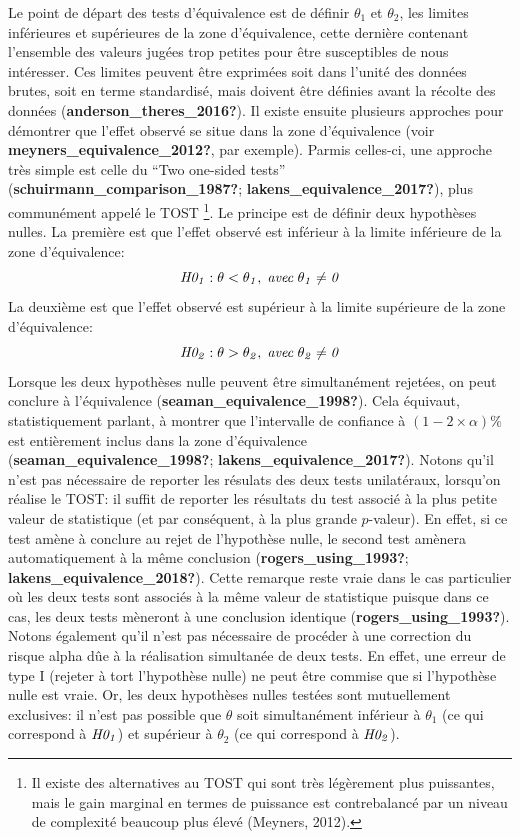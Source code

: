 \documentclass[
  english,
  man]{apa6}
\begin{document}
Le point de départ des tests d'équivalence est de définir \(\theta_1\) et \(\theta_2\), les limites inférieures et supérieures de la zone d'équivalence, cette dernière contenant l'ensemble des valeurs jugées trop petites pour être susceptibles de nous intéresser. Ces limites peuvent être exprimées soit dans l'unité des données brutes, soit en terme standardisé, mais doivent être définies avant la récolte des données (\textbf{anderson\_theres\_2016?}). Il existe ensuite plusieurs approches pour démontrer que l'effet observé se situe dans la zone d'équivalence (voir \textbf{meyners\_equivalence\_2012?}, par exemple). Parmis celles-ci, une approche très simple est celle du ``Two one-sided tests'' (\textbf{schuirmann\_comparison\_1987?}; \textbf{lakens\_equivalence\_2017?}), plus communément appelé le TOST \footnote{Il existe des alternatives au TOST qui sont très légèrement plus puissantes, mais le gain marginal en termes de puissance est contrebalancé par un niveau de complexité beaucoup plus élevé (Meyners, 2012).}. Le principe est de définir deux hypothèses nulles. La première est que l'effet observé est inférieur à la limite inférieure de la zone d'équivalence: \[\it H0_1: \theta < \theta_1, \; avec \; \theta_1 \neq 0\] La deuxième est que l'effet observé est supérieur à la limite supérieure de la zone d'équivalence: \[\it H0_2: \theta > \theta_2, \; avec \; \theta_2 \neq 0\] Lorsque les deux hypothèses nulle peuvent être simultanément rejetées, on peut conclure à l'équivalence (\textbf{seaman\_equivalence\_1998?}). Cela équivaut, statistiquement parlant, à montrer que l'intervalle de confiance à \((1-2\times\alpha)\%\) est entièrement inclus dans la zone d'équivalence (\textbf{seaman\_equivalence\_1998?}; \textbf{lakens\_equivalence\_2017?}). Notons qu'il n'est pas nécessaire de reporter les résulats des deux tests unilatéraux, lorsqu'on réalise le TOST: il suffit de reporter les résultats du test associé à la plus petite valeur de statistique (et par conséquent, à la plus grande \(p\)-valeur). En effet, si ce test amène à conclure au rejet de l'hypothèse nulle, le second test amènera automatiquement à la même conclusion (\textbf{rogers\_using\_1993?}; \textbf{lakens\_equivalence\_2018?}). Cette remarque reste vraie dans le cas particulier où les deux tests sont associés à la même valeur de statistique puisque dans ce cas, les deux tests mèneront à une conclusion identique (\textbf{rogers\_using\_1993?}). Notons également qu'il n'est pas nécessaire de procéder à une correction du risque alpha dûe à la réalisation simultanée de deux tests. En effet, une erreur de type I (rejeter à tort l'hypothèse nulle) ne peut être commise que si l'hypothèse nulle est vraie. Or, les deux hypothèses nulles testées sont mutuellement exclusives: il n'est pas possible que \(\theta\) soit simultanément inférieur à \(\theta_1\) (ce qui correspond à \(\it H0_1\)) et supérieur à \(\theta_2\) (ce qui correspond à \(\it H0_2\)).
\end{document}
